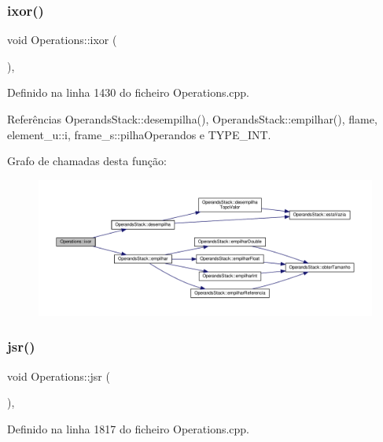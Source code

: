 \subsubsection{\texorpdfstring{ixor()}{ixor()}}
{\footnotesize\ttfamily void Operations\+::ixor (\begin{DoxyParamCaption}{ }\end{DoxyParamCaption})\hspace{0.3cm}{\ttfamily [static]}, {\ttfamily [private]}}



Definido na linha 1430 do ficheiro Operations.\+cpp.



Referências Operands\+Stack\+::desempilha(), Operands\+Stack\+::empilhar(), flame, element\+\_\+u\+::i, frame\+\_\+s\+::pilha\+Operandos e T\+Y\+P\+E\+\_\+\+I\+NT.

Grafo de chamadas desta função\+:
\nopagebreak
\begin{figure}[H]
\begin{center}
\leavevmode
\includegraphics[width=350pt]{classOperations_abd0ce3453623b677de3af1f05bcf4b0b_cgraph}
\end{center}
\end{figure}
\mbox{\label{classOperations_a63c3ab8fef60a8a19ee336cb3d86f9aa}} 
\subsubsection{\texorpdfstring{jsr()}{jsr()}}
{\footnotesize\ttfamily void Operations\+::jsr (\begin{DoxyParamCaption}{ }\end{DoxyParamCaption})\hspace{0.3cm}{\ttfamily [static]}, {\ttfamily [private]}}



Definido na linha 1817 do ficheiro Operations.\+cpp.



